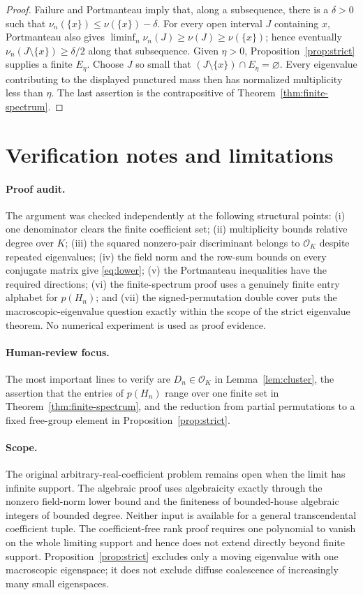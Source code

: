 \documentclass[11pt]{article}
\theoremstyle{definition}
\theoremstyle{remark}
\newcommand{\OK}{\mathcal{O}_K}
\begin{document}
\begin{proof}
Failure and Portmanteau imply that, along a subsequence, there is a $\delta>0$
such that $\nu_n(\{x\})\le\nu(\{x\})-\delta$.  For every open interval $J$
containing $x$, Portmanteau also gives
$\liminf_n\nu_n(J)\ge\nu(J)\ge\nu(\{x\})$; hence eventually
$\nu_n(J\setminus\{x\})\ge\delta/2$ along that subsequence.  Given
$\eta>0$, Proposition~\ref{prop:strict} supplies a finite $E_\eta$.
Choose $J$ so small that $(J\setminus\{x\})\cap E_\eta=\varnothing$.
Every eigenvalue contributing to the displayed punctured mass then has
normalized multiplicity less than $\eta$.  The last assertion is the
contrapositive of Theorem~\ref{thm:finite-spectrum}.
\end{proof}

\section{Verification notes and limitations}

\paragraph{Proof audit.}
The argument was checked independently at the following structural points:
(i) one denominator clears the finite coefficient set; (ii) multiplicity
bounds relative degree over $K$; (iii) the squared nonzero-pair
discriminant belongs to $\OK$ despite repeated eigenvalues; (iv) the field
norm and the row-sum bounds on every conjugate matrix give
\eqref{eq:lower}; (v) the Portmanteau inequalities have the required
directions; (vi) the finite-spectrum proof uses a genuinely finite entry
alphabet for $p(H_n)$; and (vii) the signed-permutation double cover puts the
macroscopic-eigenvalue question exactly within the scope of the strict
eigenvalue theorem.  No numerical experiment is used as proof evidence.

\paragraph{Human-review focus.}
The most important lines to verify are $D_n\in\OK$ in
Lemma~\ref{lem:cluster}, the assertion that the entries of $p(H_n)$ range over
one finite set in Theorem~\ref{thm:finite-spectrum}, and the reduction from
partial permutations to a fixed free-group element in
Proposition~\ref{prop:strict}.

\paragraph{Scope.}
The original arbitrary-real-coefficient problem remains open when the limit
has infinite support.  The algebraic proof uses algebraicity exactly through
the nonzero field-norm lower bound and the finiteness of bounded-house
algebraic integers of bounded degree.  Neither input is available for a
general transcendental coefficient tuple.  The coefficient-free rank proof
requires one polynomial to vanish on the whole limiting support and hence
does not extend directly beyond finite support.  Proposition~\ref{prop:strict}
excludes only a moving eigenvalue with one macroscopic eigenspace; it does not
exclude diffuse coalescence of increasingly many small eigenspaces.
\end{document}
